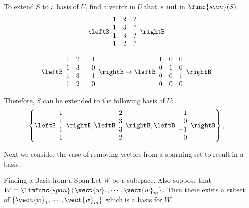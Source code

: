 \begin{solution}
To extend $S$ to a basis of $U$, find a vector in $U$ that is {\bf not} in
$\func{span}(S)$.
\[
\leftB\begin{array}{rrr}
1 & 2 & ? \\
1 & 3 & ? \\
1 & 3 & ? \\
1 & 2 & ? 
\end{array}\rightB
\]

\[
\leftB\begin{array}{rrr}
1 & 2 & 1 \\
1 & 3 & 0 \\
1 & 3 & -1 \\
1 & 2 & 0 
\end{array}\rightB
\rightarrow
\leftB\begin{array}{rrr}
1 & 0 & 0 \\
0 & 1 & 0 \\
0 & 0 & 1 \\
0 & 0 & 0 
\end{array}\rightB
\]

Therefore, $S$ can be extended to the following basis of $U$:
\[\left\{ 
\leftB\begin{array}{r} 1\\ 1\\ 1\\ 1\end{array}\rightB,
\leftB\begin{array}{r} 2\\ 3\\ 3\\ 2\end{array}\rightB,
\leftB\begin{array}{r} 1\\ 0\\ -1\\ 0\end{array}\rightB
\right\},\]
\end{solution}

Next we consider the case of removing vectors from a spanning set to result in a basis. 

\begin{theorem}{Finding a Basis from a Span}
Let $W$ be a subspace. Also suppose that $W=\limfunc{span}\left\{ \vect{w}
_{1},\cdots ,\vect{w}_{m}\right\} $. Then there exists a subset of $\left\{ 
\vect{w}_{1},\cdots ,\vect{w}_{m}\right\} $ which is a basis for $W$.
\end{theorem}

